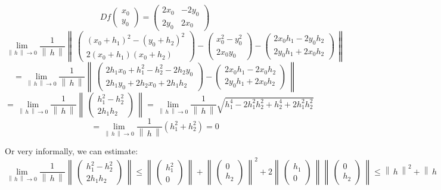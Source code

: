\documentclass[a4paper]{article}
\theoremstyle{definition}
\newcommand\norm[1]{\left\|\,#1\,\right\|}
\begin{document}
\[
  Df\begin{pmatrix} x_0 \\ y_0 \end{pmatrix} =
  \begin{pmatrix}
    2x_0 & -2y_0 \\
    2y_0 & 2x_0
  \end{pmatrix}
\] \[
  \lim_{\norm{h}\to 0} \frac{1}{\norm{h}} \norm{
    \begin{pmatrix} (x_0 + h_1)^2 - (y_0 + h_2)^2 \\ 2 (x_0 + h_1) (x_0 + h_2) \end{pmatrix}
    - \begin{pmatrix} x_0^2 - y_0^2 \\ 2 x_0 y_0 \end{pmatrix}
    - \begin{pmatrix} 2 x_0 h_1 - 2 y_0 h_2 \\ 2 y_0 h_1 + 2 x_0 h_2 \end{pmatrix}
  }
\] \[
  = \lim_{\norm{h} \to 0} \frac{1}{\norm{h}} \norm{
    \begin{pmatrix}
      2 h_1 x_0 + h_1^2 - h_2^2 - 2 h_2 y_0 \\
      2 h_1 y_0 + 2 h_2 x_0 + 2 h_1 h_2
    \end{pmatrix} - \begin{pmatrix}
      2 x_0 h_1 - 2 x_0 h_2 \\
      2 y_0 h_1 + 2 x_0 h_2
    \end{pmatrix}
  }
\] \[
  = \lim_{\norm{h} \to 0} \frac{1}{\norm{h}} \norm{
    \begin{pmatrix} h_1^2 - h_2^2 \\ 2 h_1 h_2 \end{pmatrix}
  } = \lim_{\norm{h} \to 0} \frac{1}{\norm{h}} \sqrt{h_1^4 - 2 h_1^2 h_2^2 + h_2^4 + 2 h_1^2 h_2^2}
\] \[
  = \lim_{\norm{h} \to 0} \frac{1}{\norm{h}} (h_1^2 + h_2^2) = 0
\]

Or very informally, we can estimate:
\[
  \lim_{\norm{h} \to 0} \frac{1}{\norm{h}} \norm{\begin{pmatrix} h_1^2 - h_2^2 \\ 2 h_1 h_2 \end{pmatrix}}
  \leq \norm{\begin{pmatrix} h_1^2 \\ 0 \end{pmatrix}} + \norm{\begin{pmatrix} 0 \\ h_2 \end{pmatrix}}^2 + 2 \norm{\begin{pmatrix} h_1 \\ 0 \end{pmatrix}} \norm{\begin{pmatrix} 0 \\ h_2 \end{pmatrix}}
  \leq \norm{h}^2 + \norm{h}^2 + 2\norm{h}^2
\]
\end{document}
